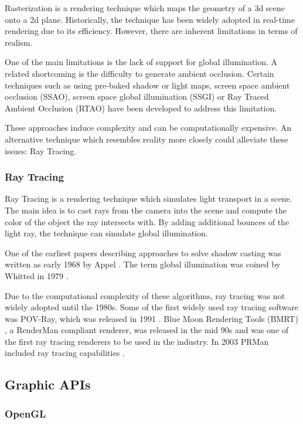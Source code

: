 Rasterization is a rendering technique which maps the geometry of a 3d scene onto a 2d plane. Historically, the technique has been widely adopted in real-time rendering due to its efficiency. However, there are inherent limitations in terms of realism.

One of the main limitations is the lack of support for global illumination. A related shortcoming is the difficulty to generate ambient occlusion. Certain techniques such as using pre-baked shadow or light maps, screen space ambient occlusion (SSAO), screen space global illumination (SSGI) or Ray Traced Ambient Occlusion (RTAO) have been developed to address this limitation.

These approaches induce complexity and can be computationally expensive. An alternative technique which resembles reality more closely could alleviate these issues: Ray Tracing.

\subsubsection{Ray Tracing}

Ray Tracing is a rendering technique which simulates light transport in a scene. The main idea is to cast rays from the camera into the scene and compute the color of the object the ray intersects with. By adding additional bounces of the light ray, the technique can simulate global illumination.

One of the earliest papers describing approaches to solve shadow casting was written as early 1968 by Appel \cite{appel1968shading}. The term global illumination was coined by Whitted in 1979 \cite{whitted2020OriginsOfGlobalIllumination}.

Due to the computational complexity of these algorithms, ray tracing was not widely adopted until the 1980s. Some of the first widely used ray tracing software was POV-Ray, which was released in 1991 \cite{POV_Ray_Documentation}. Blue Moon Rendering Tools (BMRT) \cite{bmrt}, a RenderMan compliant renderer, was released in the mid 90s and was one of the first ray tracing renderers to be used in the industry. In 2003 PRMan included ray tracing capabilities \cite{RenderMan_11_Release_Notes}.


\subsection{Graphic APIs}
\subsubsection{OpenGL}

